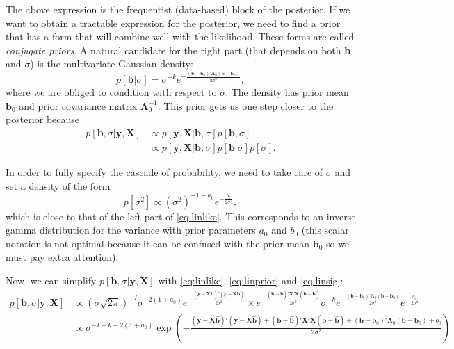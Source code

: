 \documentclass[]{krantz}
\theoremstyle{definition}
\theoremstyle{definition}
\theoremstyle{definition}
\theoremstyle{remark}
\begin{document}
The above expression is the frequentist (data-based) block of the
posterior. If we want to obtain a tractable expression for the
posterior, we need to find a prior that has a form that will combine
well with the likelihood. These forms are called \emph{conjugate
priors}. A natural candidate for the right part (that depends on both
\textbf{b} and \(\sigma\)) is the multivariate Gaussian density:
\begin{equation}
\label{eq:linprior}
p[\textbf{b}|\sigma]=\sigma^{-k}e^{-\frac{(\textbf{b}-\textbf{b}_0)'\boldsymbol{\Lambda}_0(\textbf{b}-\textbf{b}_0)}{2\sigma^2}},
\end{equation} where we are obliged to condition with respect to
\(\sigma\). The density has prior mean \(\textbf{b}_0\) and prior
covariance matrix \(\boldsymbol{\Lambda}_0^{-1}\). This prior gets us
one step closer to the posterior because \begin{align}
p[\textbf{b},\sigma|\textbf{y},\textbf{X}]& \propto p[\textbf{y},\textbf{X}|\textbf{b},\sigma]p[\textbf{b},\sigma] \nonumber \\
\label{eq:cascade}
&\propto p[\textbf{y},\textbf{X}|\textbf{b},\sigma]p[\textbf{b}|\sigma]p[\sigma]. 
\end{align}

In order to fully specify the cascade of probability, we need to take
care of \(\sigma\) and set a density of the form \begin{equation}
\label{eq:linsig}
p[\sigma^2]\propto (\sigma^2)^{-1-a_0}e^{-\frac{b_0}{2\sigma^2}},
\end{equation} which is close to that of the left part of
\eqref{eq:linlike}. This corresponds to an inverse gamma distribution for
the variance with prior parameters \(a_0\) and \(b_0\) (this scalar
notation is not optimal because it can be confused with the prior mean
\(\textbf{b}_0\) so we must pay extra attention).

Now, we can simplify \(p[\textbf{b},\sigma|\textbf{y},\textbf{X}]\) with
\eqref{eq:linlike}, \eqref{eq:linprior} and \eqref{eq:linsig}: \begin{align*}
p[\textbf{b},\sigma|\textbf{y},\textbf{X}]& \propto 
(\sigma\sqrt{2\pi})^{-I} \sigma^{-2(1+a_0)} e^{-\frac{\left(\textbf{y}-\textbf{X}\hat{\textbf{b}}\right)' \left(\textbf{y}-\textbf{X}\hat{\textbf{b}}\right)}{2\sigma^2}}\times e^{-\frac{(\textbf{b}-\hat{\textbf{b}})'\textbf{X}'\textbf{X}(\textbf{b}-\hat{\textbf{b}})}{2\sigma^2}}\sigma^{-k}e^{-\frac{(\textbf{b}-\textbf{b}_0)'\boldsymbol{\Lambda}_0(\textbf{b}-\textbf{b}_0)}{2\sigma^2}}e^{-\frac{b_0}{2\sigma^2}} \\
& \propto \sigma^{-I-k-2(1+a_0)}\exp\left(-\frac{\left(\textbf{y}-\textbf{X}\hat{\textbf{b}}\right)' \left(\textbf{y}-\textbf{X}\hat{\textbf{b}}\right) + (\textbf{b}-\hat{\textbf{b}})'\textbf{X}'\textbf{X}(\textbf{b}-\hat{\textbf{b}}) + (\textbf{b}-\textbf{b}_0)'\boldsymbol{\Lambda}_0(\textbf{b}-\textbf{b}_0)+b_0}{2\sigma^2} \right) 
\end{align*}
\end{document}
